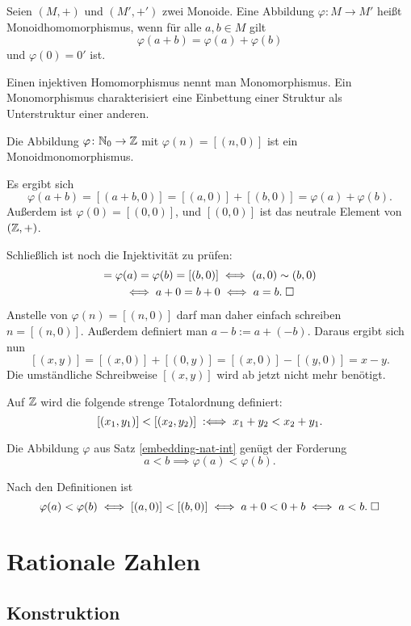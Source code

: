 \begin{Definition}[Monoidhomomorphismus]
Seien $(M,+)$ und $(M',+')$ zwei Monoide. Eine Abbildung
$\varphi\colon M\to M'$ heißt Monoidhomomorphismus, wenn
für alle $a,b\in M$ gilt
\[\varphi(a+b) = \varphi(a)+\varphi(b)\]
und $\varphi(0)=0'$ ist.
\end{Definition}
Einen injektiven Homomorphismus nennt man Monomorphismus. Ein
Monomorphismus charakterisiert eine Einbettung einer Struktur als
Unterstruktur einer anderen.

\begin{Satz}%
\label{embedding-nat-int}
Die Abbildung $\varphi\colon\mathbb N_0\to\mathbb Z$ mit $\varphi(n)=[(n,0)]$
ist ein Monoidmonomorphismus.
\end{Satz}
 Es ergibt sich
\[\varphi(a+b) = [(a+b,0)] = [(a,0)]+[(b,0)] = \varphi(a)+\varphi(b).\]
Außerdem ist $\varphi(0)=[(0,0)]$, und $[(0,0)]$
ist das neutrale Element von $(\mathbb Z,+)$.

Schließlich ist noch die Injektivität zu prüfen:
\begin{gather*}
[(a,0)] = \varphi(a) = \varphi(b)  = [(b,0)]\iff (a,0)\sim (b,0)\\
\iff a+0 = b+0 \iff a=b.\;\qedsymbol
\end{gather*}
Anstelle von $\varphi(n)=[(n,0)]$ darf man daher einfach schreiben
$n=[(n,0)]$. Außerdem definiert man $a-b:=a+(-b)$. Daraus
ergibt sich nun
\[[(x,y)] = [(x,0)]+[(0,y)] = [(x,0)] - [(y,0)] = x-y.\]
Die umständliche Schreibweise $[(x,y)]$ wird ab jetzt nicht
mehr benötigt.

\begin{Definition}
Auf $\mathbb Z$ wird die folgende strenge Totalordnung definiert:
\[[(x_1,y_1)] < [(x_2,y_2)] \;:\Longleftrightarrow\; x_1+y_2<x_2+y_1.\]
\end{Definition}
\begin{Satz}
Die Abbildung $\varphi$ aus Satz \ref{embedding-nat-int}
genügt der Forderung
\[a<b \implies \varphi(a)<\varphi(b).\]
\end{Satz}
 Nach den Definitionen ist
\[\varphi(a)<\varphi(b)\iff [(a,0)]<[(b,0)]\iff a+0<0+b\iff a<b.\;\Box\]


\newpage
\section{Rationale Zahlen}

\subsection{Konstruktion}


